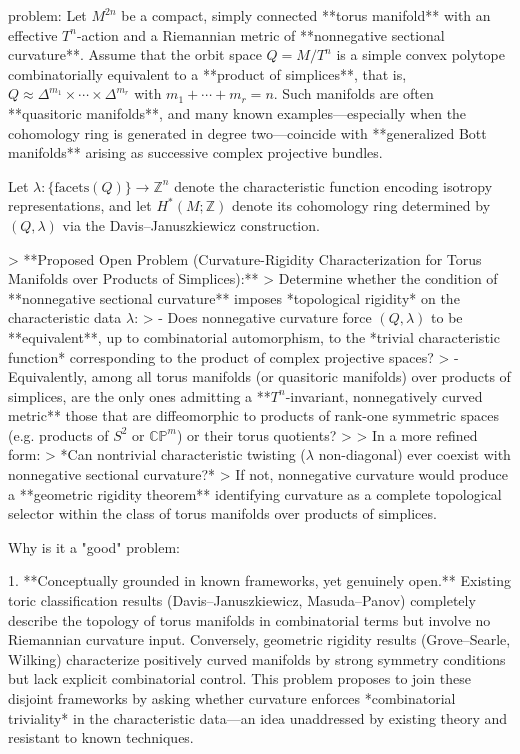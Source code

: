 problem:  
Let \( M^{2n} \) be a compact, simply connected **torus manifold** with an effective \(T^n\)-action and a Riemannian metric of **nonnegative sectional curvature**.  Assume that the orbit space \(Q = M/T^n\) is a simple convex polytope combinatorially equivalent to a **product of simplices**, that is, \(Q \approx \Delta^{m_1} \times \cdots \times \Delta^{m_r}\) with \(m_1 + \cdots + m_r = n\).  Such manifolds are often **quasitoric manifolds**, and many known examples—especially when the cohomology ring is generated in degree two—coincide with **generalized Bott manifolds** arising as successive complex projective bundles.  

Let \(\lambda : \{\text{facets}(Q)\} \to \mathbb{Z}^n\) denote the characteristic function encoding isotropy representations, and let \(H^*(M;\mathbb{Z})\) denote its cohomology ring determined by \((Q, \lambda)\) via the Davis–Januszkiewicz construction.  

> **Proposed Open Problem (Curvature-Rigidity Characterization for Torus Manifolds over Products of Simplices):**  
> Determine whether the condition of **nonnegative sectional curvature** imposes *topological rigidity* on the characteristic data \(\lambda\):  
> - Does nonnegative curvature force \((Q, \lambda)\) to be **equivalent**, up to combinatorial automorphism, to the *trivial characteristic function* corresponding to the product of complex projective spaces?  
> - Equivalently, among all torus manifolds (or quasitoric manifolds) over products of simplices, are the only ones admitting a **\(T^n\)-invariant, nonnegatively curved metric** those that are diffeomorphic to products of rank-one symmetric spaces (e.g. products of \(S^2\) or \(\mathbb{CP}^m\)) or their torus quotients?  
>  
> In a more refined form:  
> *Can nontrivial characteristic twisting (\(\lambda\) non-diagonal) ever coexist with nonnegative sectional curvature?*  
> If not, nonnegative curvature would produce a **geometric rigidity theorem** identifying curvature as a complete topological selector within the class of torus manifolds over products of simplices.

Why is it a "good" problem:  

1. **Conceptually grounded in known frameworks, yet genuinely open.**  
   Existing toric classification results (Davis–Januszkiewicz, Masuda–Panov) completely describe the topology of torus manifolds in combinatorial terms but involve no Riemannian curvature input.  Conversely, geometric rigidity results (Grove–Searle, Wilking) characterize positively curved manifolds by strong symmetry conditions but lack explicit combinatorial control.  
   This problem proposes to join these disjoint frameworks by asking whether curvature enforces *combinatorial triviality* in the characteristic data—an idea unaddressed by existing theory and resistant to known techniques.

